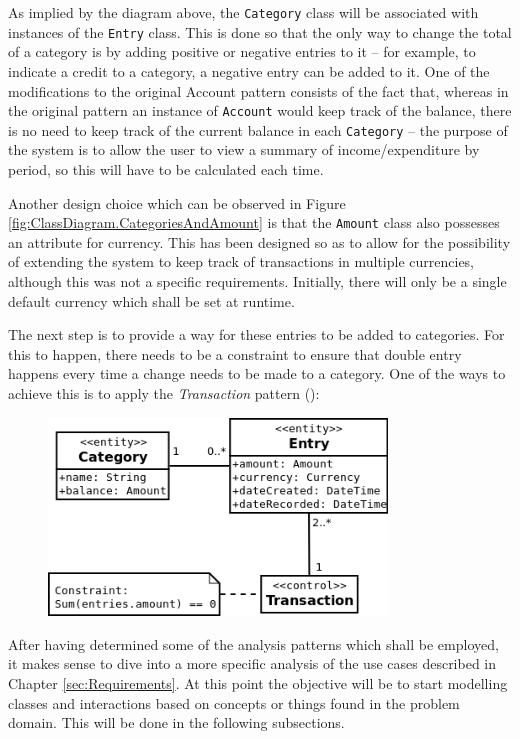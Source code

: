 As implied by the diagram above, the \texttt{Category} class will be associated
with instances of the \texttt{Entry} class. This is done so that the only way to
change the total of a category is by adding positive or negative entries to it
-- for example, to indicate a credit to a category, a negative entry can be
added to it. One of the modifications to the original Account pattern consists
of the fact that, whereas in the original pattern an instance of
\texttt{Account} would keep track of the balance, there is no need to keep
track of the current balance in each \texttt{Category} -- the purpose of the
system is to allow the user to view a summary of income/expenditure by period,
so this will have to be calculated each time.

Another design choice which can be observed in Figure
\ref{fig:ClassDiagram.CategoriesAndAmount} is that the \texttt{Amount} class
also possesses an attribute for currency. This has been designed so as to allow
for the possibility of extending the system to keep track of transactions in
multiple currencies, although this was not a specific requirements. Initially,
there will only be a single default currency which shall be set at runtime.

The next step is to provide a way for these entries to be added to categories.
For this to happen, there needs to be a constraint to ensure that double entry
happens every time a change needs to be made to a category. One of the ways to
achieve this is to apply the \emph{Transaction} pattern
(\cite[][Section~6.2]{fowler1997analysis}):
\begin{figure}[ht!]
  \begin{center}
    \includegraphics[width=9cm]{./contents/img/Class_Diagram_-_Transaction.png}
  \end{center}
  \caption{}
  \label{fig:ClassDiagram.Transaction}
\end{figure}
\FloatBarrier

After having determined some of the analysis patterns which shall be employed,
it makes sense to dive into a more specific analysis of the use cases described
in Chapter \ref{sec:Requirements}. At this point the objective will be to start
modelling classes and interactions based on concepts or things found in the
problem domain. This will be done in the following subsections.

